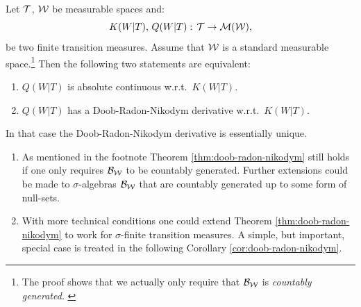 \begin{Thm}
    \label{thm:doob-radon-nikodym}
    Let $\mathcal{T}$, $\mathcal{W}$ be measurable spaces and:
    \[ K(W|T), \,Q(W|T):\, \mathcal{T} \to \mathcal{M}(\mathcal{W}),  \]
    be two finite transition measures. Assume that $\mathcal{W}$ is a standard measurable space.\footnote{The proof shows that we actually only require that $\mathcal{B}_{\mathcal{W}}$ is \emph{countably generated}. \label{fn:count-generated}} Then the following two statements are equivalent:
    \begin{enumerate}
        \item $Q(W|T)$ is absolute continuous w.r.t.\ $K(W|T)$.  
        \item $Q(W|T)$ has a Doob-Radon-Nikodym derivative w.r.t.\ $K(W|T)$.
    \end{enumerate}
    In that case the Doob-Radon-Nikodym derivative is essentially unique.
\end{Thm}

\begin{Rem}
    \begin{enumerate}
        \item As mentioned in the footnote Theorem \ref{thm:doob-radon-nikodym} still holds if one only requires $\mathcal{B}_{\mathcal{W}}$ to be countably generated. Further extensions could be made to $\sigma$-algebras $\mathcal{B}_{\mathcal{W}}$ that are countably generated up to some form of null-sets.
        \item With more technical conditions one could extend Theorem \ref{thm:doob-radon-nikodym} to work for $\sigma$-finite transition measures. A simple, but important, special case is treated in the following Corollary \ref{cor:doob-radon-nikodym}.
    \end{enumerate}
\end{Rem}

